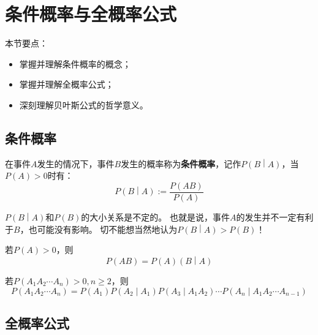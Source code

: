 \section{条件概率与全概率公式}

本节要点：
\begin{itemize}
    \item 掌握并理解条件概率的概念；
    \item 掌握并理解全概率公式；
    \item 深刻理解贝叶斯公式的哲学意义。
\end{itemize}

\subsection{条件概率}

\begin{definition}[条件概率]
在事件$A$发生的情况下，事件$B$发生的概率称为{\bf 条件概率}，记作$P\left( B \middle| A \right) $，当$P\left( A \right) >0$时有：
\[
P\left( B \middle| A \right) := \frac{P\left( AB \right)}{P\left( A \right)}
\]
\end{definition}

\begin{tcolorbox}
$P\left( B \middle| A \right) $和$P\left( B \right) $的大小关系是不定的。
也就是说，事件$A$的发生并不一定有利于$B$，也可能没有影响。
切不能想当然地认为$P\left( B \middle| A \right) >P\left( B \right) $！
\end{tcolorbox}

\begin{theorem}[乘法公式]
若$P\left( A \right) >0$，则
\[
P\left( AB \right) =P\left( A \right) \left( B \middle| A \right)
\]
\end{theorem}

\begin{corollary}[乘法公式]
若$P\left( A_1A_2\cdots A_n \right) >0,n\geqslant 2$，则
\[
P\left( A_1A_2\cdots A_n \right) =P\left( A_1 \right) P\left( A_2 \middle| A_1 \right) P\left( A_3 \middle| A_1A_2 \right) \cdots P\left( A_n \middle| A_1A_2\cdots A_{n-1} \right)
\]
\end{corollary}

\subsection{全概率公式}

